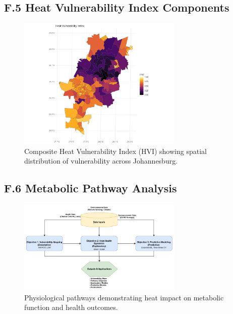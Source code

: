 \documentclass[12pt,a4paper,landscape]{article}
\begin{document}
\subsection*{F.5 Heat Vulnerability Index Components}
\begin{figure}[H]
    \centering
    \includegraphics[width=0.7\textwidth]{images/HVI_map_Johannesburg_prelim_analysis.png}
    \caption{Composite Heat Vulnerability Index (HVI) showing spatial distribution of vulnerability across Johannesburg.}
    \label{fig:hvi}
\end{figure}

\subsection*{F.6 Metabolic Pathway Analysis}
\begin{figure}[H]
    \centering
    \includegraphics[width=0.7\textwidth]{images/AnalyticalFW.png}
    \caption{Physiological pathways demonstrating heat impact on metabolic function and health outcomes.}
    \label{fig:metabolic}
\end{figure}
\end{document}
